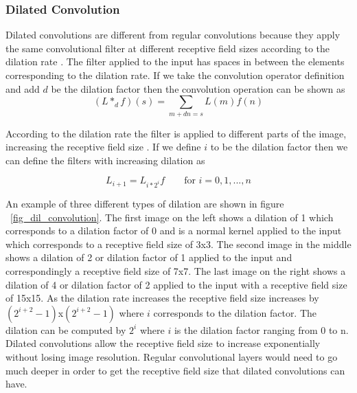 \subsubsection{Dilated Convolution}
    Dilated convolutions are different from regular convolutions because they apply the same convolutional filter at different receptive field sizes according to the dilation rate \cite{Yu2016MultiScaleCA}.
    The filter applied to the input has spaces in between the elements corresponding to the dilation rate.
    If we take the convolution operator definition and add $d$ be the dilation factor then the convolution operation can be shown as 
\begin{equation}
 (L *_d f)(s) = \sum_{m+dn=s} L(m)f(n)\label{eq:dilconvolution}
\end{equation}

     According to the dilation rate the filter is applied to different parts of the image, increasing the receptive field size \cite{DBLP:journals/corr/ChenPSA17}. 
     If we define $i$ to be the dilation factor then we can define the filters with increasing dilation as
    
\begin{equation}
 L_{i+1} = L_{i*2^i} f \qquad \mbox{for   } i = 0,1,...,n\label{eq:dilatedrate} 
\end{equation}
    
    An example of three different types of dilation are shown in figure ~\ref{fig_dil_convolution}. The first image on the left shows a dilation of 1 which corresponds to a dilation factor of 0 and is a normal kernel applied to the input which corresponds to a receptive field size of 3x3. The second image in the middle shows a dilation of 2 or dilation factor of 1 applied to the input and correspondingly a receptive field size of 7x7. The last image on the right shows a dilation of 4 or dilation factor of 2 applied to the input with a receptive field size of 15x15.
    As the dilation rate increases the receptive field size increases by $(2^{i+2}-1)$x$(2^{i+2}-1)$ where $i$ corresponds to the dilation factor.
    The dilation can be computed by $2^i$ where $i$ is the dilation factor ranging from 0 to n. 
    Dilated convolutions allow the receptive field size to increase exponentially without losing image resolution.
    Regular convolutional layers would need to go much deeper in order to get the receptive field size that dilated convolutions can have.
    
